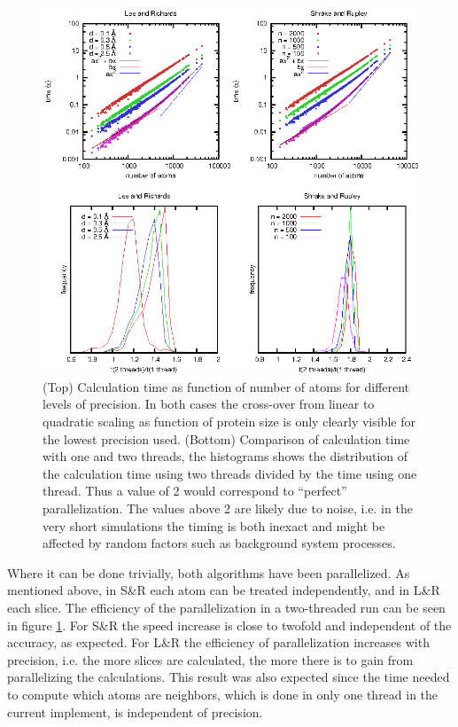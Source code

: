 \documentclass[a4paper,11pt]{article}
\begin{document}
\begin{figure}
  \begin{center}
  \includegraphics{../analysis/plots/time}
  \caption{(Top) Calculation time as function of number of atoms for
    different levels of precision. In both cases the cross-over from
    linear to quadratic scaling as function of protein size is only
    clearly visible for the lowest precision used.  (Bottom)
    Comparison of calculation time with one and two threads, the
    histograms shows the distribution of the calculation time using
    two threads divided by the time using one thread. Thus a value of
    2 would correspond to ``perfect'' parallelization. The values
    above 2 are likely due to noise, i.e. in the very short
    simulations the timing is both inexact and might be affected by
    random factors such as background system processes.
    \label{fig:time}}
  \end{center}
\end{figure}

Where it can be done trivially, both algorithms have been
parallelized. As mentioned above, in S\&R each atom can be treated
independently, and in L\&R each slice. The efficiency of the
parallelization in a two-threaded run can be seen in figure
\ref{fig:time}. For S\&R the speed increase is close to twofold and
independent of the accuracy, as expected. For L\&R the efficiency of
parallelization increases with precision, i.e. the more slices are
calculated, the more there is to gain from parallelizing the
calculations. This result was also expected since the time needed to
compute which atoms are neighbors, which is done in only one thread in
the current implement, is independent of precision.
\end{document}
